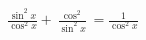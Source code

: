 \documentclass[preview]{standalone}
\begin{document}
\begin{align*}
\frac{\sin^2x}{\cos^2x} + \frac{\cos^2}{\sin^2x} = \frac{1}{\cos^2x}
\end{align*}
\end{document}

